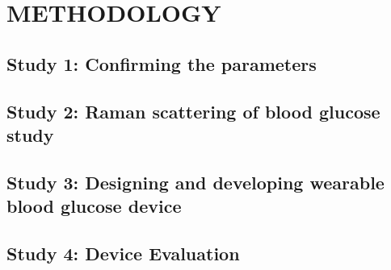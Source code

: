 \setlength{\footskip}{8mm}

\chapter{METHODOLOGY}\label{methodology}

\section{Study 1: Confirming the parameters}

\cite{directGlucose}

\section{Study 2: Raman scattering of blood glucose study}
\section{Study 3: Designing and developing wearable blood glucose device}
\section{Study 4: Device Evaluation}